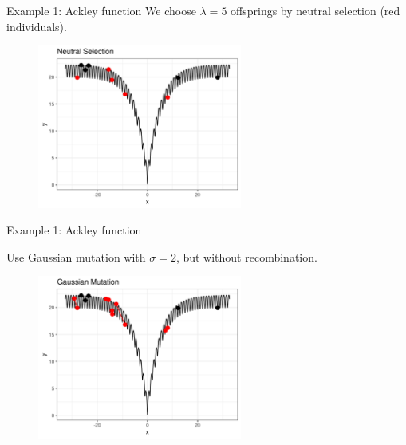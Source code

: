 \documentclass[11pt,compress,t,notes=noshow, xcolor=table]{beamer}
\begin{document}




\begin{vbframe}{Example 1: Ackley function}
We choose $\lambda = 5$ offsprings by neutral selection (red individuals).

\vspace{0.5cm}

\begin{center}
\begin{figure}
  \includegraphics[width=0.6\textwidth]{figure_man/1dim-ackley-func-neutral-selec.png}
\end{figure}
\end{center}

\end{vbframe}

\begin{vbframe}{Example 1: Ackley function}

Use Gaussian mutation with $\sigma=2$, but without recombination.

\medskip

\begin{center}
\begin{figure}
  \includegraphics[width=0.6\textwidth]{figure_man/1dim-ackley-func-gaussian-mutation.png}
\end{figure}
\end{center}

\end{vbframe}
\end{document}
